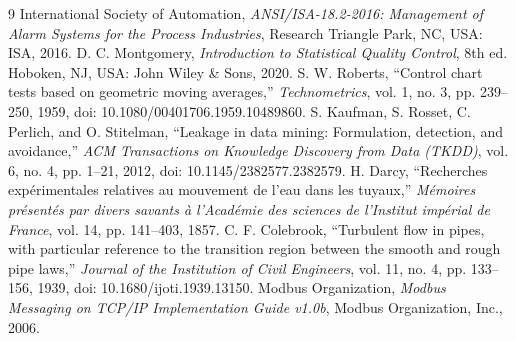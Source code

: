 \documentclass[fontset=none, a4paper, 12pt]{ctexart}
\begin{document}
\begin{doublespace}
\clearpage
{}
{}

\begin{thebibliography}{9}
 International Society of Automation, \emph{ANSI/ISA-18.2-2016: Management of Alarm Systems for the Process Industries}, Research Triangle Park, NC, USA: ISA, 2016.
 D. C. Montgomery, \emph{Introduction to Statistical Quality Control}, 8th ed. Hoboken, NJ, USA: John Wiley \& Sons, 2020.
 S. W. Roberts, ``Control chart tests based on geometric moving averages,'' \emph{Technometrics}, vol. 1, no. 3, pp. 239--250, 1959, doi: 10.1080/00401706.1959.10489860.
 S. Kaufman, S. Rosset, C. Perlich, and O. Stitelman, ``Leakage in data mining: Formulation, detection, and avoidance,'' \emph{ACM Transactions on Knowledge Discovery from Data (TKDD)}, vol. 6, no. 4, pp. 1--21, 2012, doi: 10.1145/2382577.2382579.
 H. Darcy, ``Recherches exp{\'e}rimentales relatives au mouvement de l'eau dans les tuyaux,'' \emph{M{\'e}moires pr{\'e}sent{\'e}s par divers savants {\`a} l'Acad{\'e}mie des sciences de l'Institut imp{\'e}rial de France}, vol. 14, pp. 141--403, 1857.
 C. F. Colebrook, ``Turbulent flow in pipes, with particular reference to the transition region between the smooth and rough pipe laws,'' \emph{Journal of the Institution of Civil Engineers}, vol. 11, no. 4, pp. 133--156, 1939, doi: 10.1680/ijoti.1939.13150.
 Modbus Organization, \emph{Modbus Messaging on TCP/IP Implementation Guide v1.0b}, Modbus Organization, Inc., 2006.
\end{thebibliography}

\end{doublespace}
\end{document}
